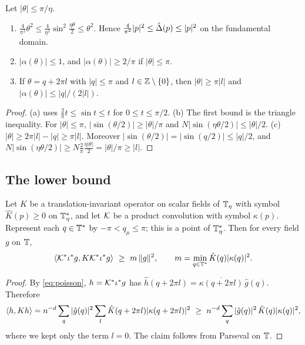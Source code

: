 \begin{lemma}\label{lem:symbols}
Let $|\theta|\le\pi/\eta$.
\begin{enumerate}[label=(\alph*)]
\item $\frac4{\pi^2}\theta^2\le\frac4{\eta^2}\sin^2\frac{\eta\theta}2\le\theta^2$. Hence $\frac4{\pi^2}|p|^2\le\hat{\Delta}(p)\le|p|^2$ on the fundamental domain.
\item $|\alpha(\theta)|\le1$, and $|\alpha(\theta)|\ge2/\pi$ if $|\theta|\le\pi$.
\item If $\theta=q+2\pi l$ with $|q|\le\pi$ and $l\in\mathbb Z\setminus\{0\}$, then $|\theta|\ge\pi|l|$ and $|\alpha(\theta)|\le|q|/(2|l|)$.
\end{enumerate}
\end{lemma}

\begin{proof}
(a) uses $\frac2\pi t\le\sin t\le t$ for $0\le t\le\pi/2$. (b) The first bound is the triangle inequality. For $|\theta|\le\pi$, $|\sin(\theta/2)|\ge|\theta|/\pi$ and $N|\sin(\eta\theta/2)|\le|\theta|/2$. (c) $|\theta|\ge2\pi|l|-|q|\ge\pi|l|$. Moreover $|\sin(\theta/2)|=|\sin(q/2)|\le|q|/2$, and $N|\sin(\eta\theta/2)|\ge N\frac2\pi\frac{\eta|\theta|}2=|\theta|/\pi\ge|l|$.
\end{proof}

\subsection{The lower bound}

\begin{lemma}\label{lem:fourier-lower}
Let $K$ be a translation-invariant operator on scalar fields of $\mathbb T_\eta$ with symbol $\hat K(p)\ge0$ on $\mathbb T_\eta^*$, and let $\mathcal K$ be a product convolution with symbol $\kappa(p)$. Represent each $q\in\mathbb T^*$ by $-\pi<q_\mu\le\pi$; this is a point of $\mathbb T_\eta^*$. Then for every field $g$ on $\mathbb T$,
\[
\ip{\cK^*\iota^*g}{K\cK^*\iota^*g}\ \ge\ m\,\|g\|^2,\qquad m=\min_{q\in\T^*}\hat K(q)|\kappa(q)|^2 .
\]
\end{lemma}

\begin{proof}
By \eqref{eq:poisson}, $h=\mathcal K^*\iota^*g$ has $\hat h(q+2\pi l)=\overline{\kappa(q+2\pi l)}\,\hat g(q)$. Therefore
\[
\ip h{Kh}=n^{-d}\sum_q|\hat g(q)|^2\sum_l\hat K(q+2\pi l)|\kappa(q+2\pi l)|^2\ \ge\ n^{-d}\sum_q|\hat g(q)|^2\,\hat K(q)|\kappa(q)|^2,
\]
where we kept only the term $l=0$. The claim follows from Parseval on $\mathbb T$.
\end{proof}


